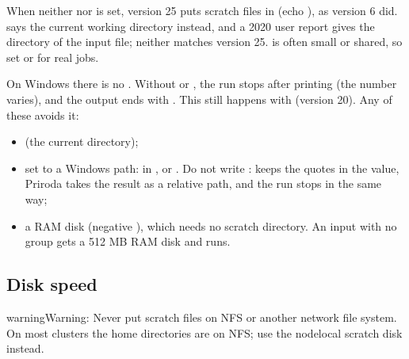\documentclass[letterpaper,10pt,english,openany,oneside]{sphinxmanual}
\begin{document}
\sphinxAtStartPar
When neither  nor  is set, version 25 puts scratch files in  (echo ), as
version 6 did.  says the current working directory instead, and a 2020 user report gives the directory of
the input file; neither matches version 25.  is often small or shared, so set  or  for real jobs.



\sphinxAtStartPar
On Windows there is no . Without  or , the run stops after printing
 (the number varies), and the output ends with . This
still happens with  (version 20). Any of these avoids it:
\begin{itemize}
\item {} 
\sphinxAtStartPar
{} (the current directory);

\item {} 
\sphinxAtStartPar
{} set to a Windows path: in ,  or . Do not write
:  keeps the quotes in the value, Priroda takes the result as a relative path, and
the run stops in the same way;

\item {} 
\sphinxAtStartPar
a RAM disk (negative ), which needs no scratch directory. An input with no  group gets a 512 MB RAM
disk and runs.

\end{itemize}




\subsection{Disk speed}
\label{\detokenize{start/running:disk-speed}}\label{\detokenize{start/running:running-disk-speed}}
\begin{sphinxadmonition}{warning}{Warning:}
\sphinxAtStartPar
Never put scratch files on NFS or another network file system. On most clusters the home directories are on NFS;
use the node\sphinxhyphen{}local scratch disk instead.
\end{sphinxadmonition}
\end{document}

